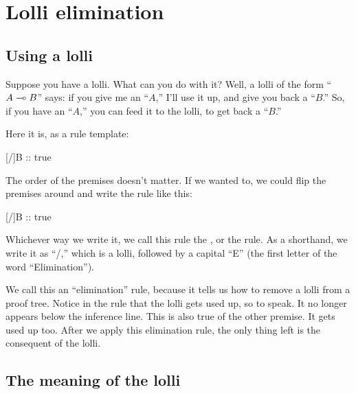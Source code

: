 \documentclass[../../../main.tex]{subfiles}
\begin{document}
\chapter{Lolli elimination}


\section{Using a lolli}

Suppose you have a lolli. What can you do with it? Well, a lolli of the form ``$A \lolli/ B$'' says: if you give me an ``$A$,'' I'll use it up, and give you back a ``$B$.'' So, if you have an ``$A$,'' you can feed it to the lolli, to get back a ``$B$.''

Here it is, as a rule template:

\begin{prooftree*}
  [\lolliElim/]{B :: true}
\end{prooftree*}

\noindent
The order of the premises doesn't matter. If we wanted to, we could flip the premises around and write the rule like this:

\begin{prooftree*}
  [\lolliElim/]{B :: true}
\end{prooftree*}

\noindent
Whichever way we write it, we call this rule the , or the  rule. As a shorthand, we write it as ``\lolliElim/,'' which is a lolli, followed by a capital ``E'' (the first letter of the word ``Elimination''). 

We call this an ``elimination'' rule, because it tells us how to remove a lolli from a proof tree. Notice in the rule that the lolli gets used up, so to speak. It no longer appears below the inference line. This is also true of the other premise. It gets used up too. After we apply this elimination rule, the only thing left is the consequent of the lolli.


\section{The meaning of the lolli}
\end{document}
